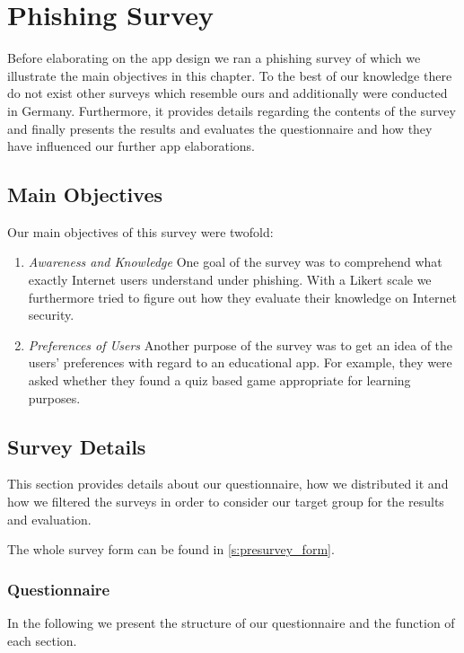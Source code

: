\section{Phishing Survey}
\label{s:survey}
Before elaborating on the app design we ran a phishing survey of which we illustrate the main objectives in this chapter.
 To the best of our knowledge there do not exist other surveys which resemble ours and additionally were conducted in Germany.
 Furthermore, it provides details regarding the contents of the survey and finally presents the results and evaluates the questionnaire and how they have influenced our further app elaborations.


\subsection{Main Objectives}
Our main objectives of this survey were twofold:

\begin{enumerate}
	\item \textit{Awareness and Knowledge} One goal of the survey was to comprehend what exactly Internet users understand under phishing.
 With a Likert scale we furthermore tried to figure out how they evaluate their knowledge on Internet security.

	\item \textit{Preferences of Users} Another purpose of the survey was to get an idea of the users' preferences with regard to an educational app.
 For example, they were asked whether they found a quiz based game appropriate for learning purposes.

\end{enumerate}
\subsection{Survey Details}
This section provides details about our questionnaire, how we distributed it and how we filtered the surveys in order to consider our target group for the results and evaluation.

The whole survey form can be found in \autoref{s:presurvey_form}.

\subsubsection{Questionnaire}
In the following we present the structure of our questionnaire and the function of each section.
 
